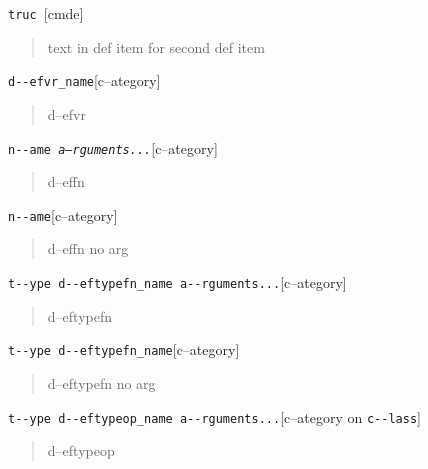 \documentclass{book}
\newcommand\GNUTexinfocommandstyletextvar[1]{{\normalfont{}\textsl{#1}}}%
\begin{document}
\begin{titlepage}
\index[fn]{i@\texttt{\GNUTexinfocommandstyletextvar{i}}}%
\noindent\texttt{truc \EmbracOn{}\textnormal{\textsl{}}\EmbracOff{}}\hfill[cmde]

%
\begin{quote}
\unskip{\parskip=0pt\noindent}%
text in def item for second def item
\end{quote}


\noindent\texttt{d{-}{-}efvr\_name}\hfill[c--ategory]

%
\begin{quote}
\unskip{\parskip=0pt\noindent}%
d--efvr
\end{quote}

\noindent\texttt{n{-}{-}ame \EmbracOn{}\textnormal{\textsl{a--rguments...}}\EmbracOff{}}\hfill[c--ategory]

%
\begin{quote}
\unskip{\parskip=0pt\noindent}%
d--effn
\end{quote}

\noindent\texttt{n{-}{-}ame}\hfill[c--ategory]

%
\begin{quote}
\unskip{\parskip=0pt\noindent}%
d--effn no arg
\end{quote}

\noindent\texttt{t{-}{-}ype d{-}{-}eftypefn\_name a{-}{-}rguments...}\hfill[c--ategory]

%
\begin{quote}
\unskip{\parskip=0pt\noindent}%
d--eftypefn
\end{quote}

\noindent\texttt{t{-}{-}ype d{-}{-}eftypefn\_name}\hfill[c--ategory]

%
\begin{quote}
\unskip{\parskip=0pt\noindent}%
d--eftypefn no arg
\end{quote}

\noindent\texttt{t{-}{-}ype d{-}{-}eftypeop\_name a{-}{-}rguments...}\hfill[c--ategory on \texttt{c{-}{-}lass}]

%
\begin{quote}
\unskip{\parskip=0pt\noindent}%
d--eftypeop
\end{quote}


\end{titlepage}
\end{document}
